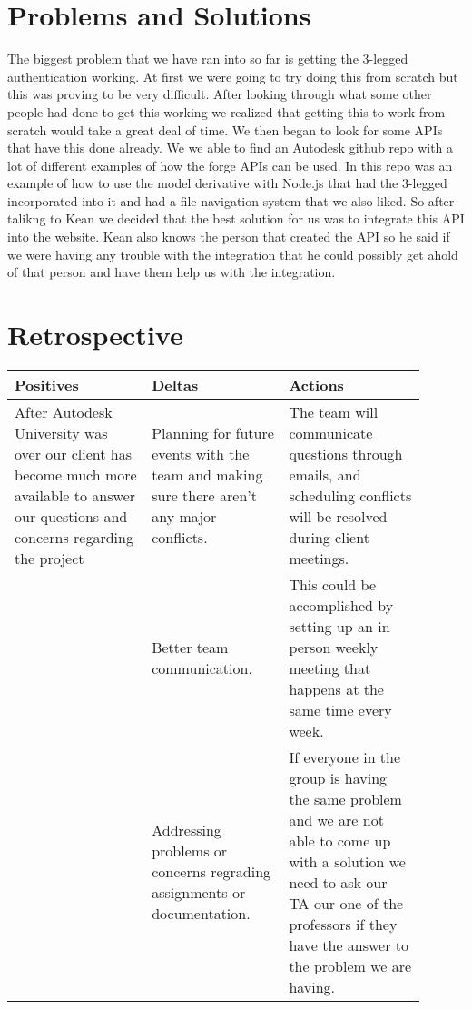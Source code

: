\documentclass[10pt,draftclsnofoot,onecolumn]{IEEEtran}
\begin{document}
\section{Problems and Solutions}
The biggest problem that we have ran into so far is getting the 3-legged authentication working. At first we were going to try doing this from scratch but this was proving to be very difficult. After looking through what some other people had done to get this working we realized that getting this to work from scratch would take a great deal of time. We then began to look for some APIs that have this done already. We we able to find an Autodesk github repo with a lot of different examples of how the forge APIs can be used. In this repo was an example of how to use the model derivative with Node.js that had the 3-legged incorporated into it and had a file navigation system that we also liked. So after talikng to Kean we decided that the best solution for us was to integrate this API into the website. Kean also knows the person that created the API so he said if we were having any trouble with the integration that he could possibly get ahold of that person and have them help us with the integration.



\section{Retrospective}

\begin{center}
\begin{tabular}{ |p{0.3\linewidth}|p{0.3\linewidth}|p{0.3\linewidth}| } 
 \hline
 \textbf{Positives} & Deltas & Actions \\ 
\hline
After Autodesk University was over our client has become much more available to answer our questions and concerns regarding the project & Planning for future events with the team and making sure there aren't any major conflicts. & The team will communicate questions through emails, and scheduling conflicts will be resolved during client meetings. \\
\hline
  & Better team communication. & This could be accomplished by setting up an in person weekly meeting that happens at the same time every week. \\
\hline 
  & Addressing problems or concerns regrading assignments or documentation. & If everyone in the group is having the same problem and we are not able to come up with a solution we need to ask our TA our one of the professors if they have the answer to the problem we are having. \\ 
 \hline
\end{tabular}
\end{center}
\end{document}
